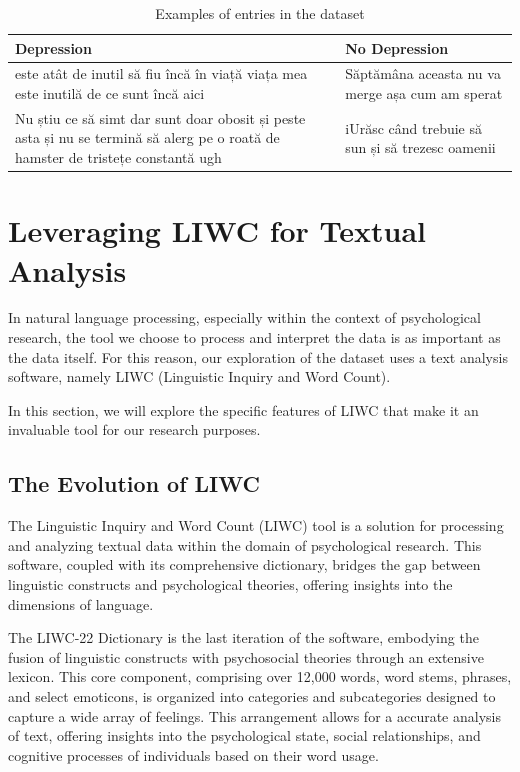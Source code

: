 \begin{table}[ht]
\centering
\renewcommand{\arraystretch}{1.5} %
\begin{adjustbox}{width=\textwidth}
\begin{tabular}{|p{}|p{}|} %
\hline
\textbf{Depression} & \textbf{No Depression} \\ \hline
este atât de inutil să fiu încă în viață viața mea este inutilă de ce sunt încă aici & Săptămâna aceasta nu va merge așa cum am sperat\\ \hline
Nu știu ce să simt dar sunt doar obosit și peste asta și nu se termină să alerg pe o roată de hamster de tristețe constantă ugh & iUrăsc când trebuie să sun și să trezesc oamenii \\ \hline
\end{tabular}
\end{adjustbox}
\caption{Examples of entries in the dataset}
\label{datasetRomanianExamples}
\end{table}


\section{Leveraging LIWC for Textual Analysis}

\quad In natural language processing, especially within the context of psychological research, the tool we choose to process and interpret the data is as important as the data itself. For this reason, our exploration of the dataset uses a text analysis software, namely LIWC (Linguistic Inquiry and Word Count).

In this section, we will explore the specific features of LIWC that make it an invaluable tool for our research purposes. 


\subsection{The Evolution of LIWC}

\quad The Linguistic Inquiry and Word Count (LIWC) tool is a solution for processing and analyzing textual data within the domain of psychological research. This software, coupled with its comprehensive dictionary, bridges the gap between linguistic constructs and psychological theories, offering insights into the dimensions of language.

\quad The LIWC-22 Dictionary is the last iteration of the software, embodying the fusion of linguistic constructs with psychosocial theories through an extensive lexicon. This core component, comprising over 12,000 words, word stems, phrases, and select emoticons, is organized into categories and subcategories designed to capture a wide array of feelings. This arrangement allows for a accurate analysis of text, offering insights into the psychological state, social relationships, and cognitive processes of individuals based on their word usage.

